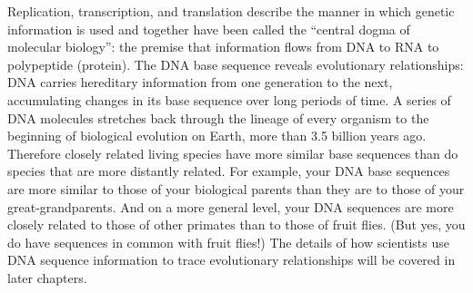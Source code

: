 \documentclass{report}
\begin{document}
Replication, transcription, and translation describe the manner in which genetic information is used and together have been called the ``central dogma of molecular biology'': the premise that information flows from DNA to RNA to polypeptide (protein). The DNA base sequence reveals evolutionary relationships: DNA carries hereditary information from one generation to the next, accumulating changes in its base sequence over long periods of time. A series of DNA molecules stretches back through the lineage of every organism to the beginning of biological evolution on Earth, more than 3.5 billion years ago. Therefore closely related living species have more similar base sequences than do species that are more distantly related. For example, your DNA base sequences are more similar to those of your biological parents than they are to those of your great-grandparents. And on a more general level, your DNA sequences are more closely related to those of other primates than to those of fruit flies. (But yes, you do have sequences in common with fruit flies!) The details of how scientists use DNA sequence information to trace evolutionary relationships will be covered in later chapters.
\end{document}
